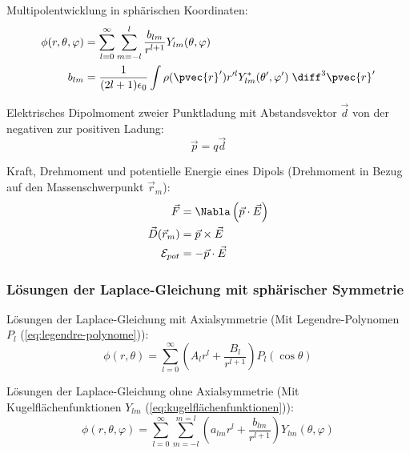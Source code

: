 \documentclass[11pt]{article}
\numberwithin{equation}{section}
\begin{document}
        Multipolentwicklung in sphärischen Koordinaten:
        \begin{equation}
          \begin{aligned}
            \phi(r,\theta,\varphi) &= \sum_{l=0}^{\infty}\sum_{m=-l}^{l} \frac{b_{lm}}{r^{l+1}}Y_{lm}(\theta,\varphi) \\
            b_{lm} &= \frac{1}{(2l+1)\epsilon_0}\int\rho(\pvec{r}')r'^lY^{*}_{lm}(\theta',\varphi')\;\diff^3\pvec{r}'
          \end{aligned}
        \end{equation}

        Elektrisches Dipolmoment zweier Punktladung mit Abstandsvektor $\vec{d}$ von der negativen zur positiven Ladung:
        \begin{equation}
          \vec{p}=q\vec{d}
        \end{equation}

        Kraft, Drehmoment und potentielle Energie eines Dipols (Drehmoment in Bezug auf den Massenschwerpunkt $\vec{r}_m$):
        \begin{equation}
          \begin{aligned}
            \vec{F} &= \Nabla\left(\vec{p}\cdot\vec{E}\right) \\
            \vec{D}(\vec{r}_m) &= \vec{p}\times\vec{E} \\
            \mathcal{E}_{pot} &= -\vec{p}\cdot\vec{E} \\
          \end{aligned}
        \end{equation}

      \subsubsection{Lösungen der Laplace-Gleichung mit sphärischer Symmetrie}
        Lösungen der Laplace-Gleichung mit Axialsymmetrie (Mit Legendre-Polynomen $P_l$ (\ref{eq:legendre-polynome})):
        \begin{equation}
          \phi(r,\theta)=\sum_{l=0}^\infty \left(A_l r^l + \frac{B_l}{r^{l+1}}\right)P_l(\cos\theta)
        \end{equation}

        Lösungen der Laplace-Gleichung ohne Axialsymmetrie (Mit Kugelflächenfunktionen $Y_{lm}$ (\ref{eq:kugelflächenfunktionen})):
        \begin{equation}
          \phi(r,\theta,\varphi) = \sum_{l=0}^{\infty}\sum_{m=-l}^{m=l} \left(a_{lm} r^l + \frac{b_{lm}}{r^{l+1}}\right) Y_{lm}(\theta, \varphi)
        \end{equation}
\end{document}
